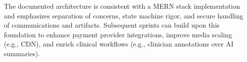 \documentclass[12pt]{article}
\begin{document}
The documented architecture is consistent with a MERN stack implementation and emphasizes separation of concerns, state machine rigor, and secure handling of communications and artifacts. Subsequent sprints can build upon this foundation to enhance payment provider integrations, improve media scaling (e.g., CDN), and enrich clinical workflows (e.g., clinician annotations over AI summaries).
\end{document}
